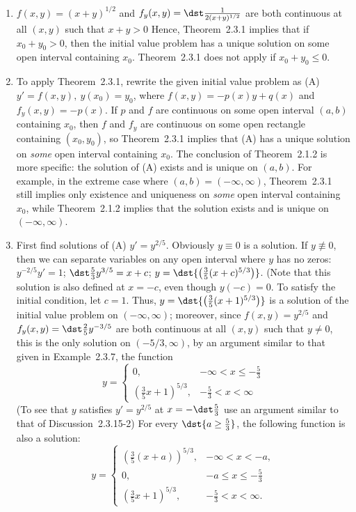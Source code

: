 \documentclass[openany]{book}
\newenvironment{sectionSolutions}{
 \begin{enumerate}[item-label={\thesection.\arabic{enumi}.}]
}{
 \end{enumerate}
}
\begin{document}
\begin{sectionSolutions}
\item
$f(x,y)=(x+y)^{1/2}$ and $f_y(x,y)=\dst\frac{1}{2(x+y)^{1/2}}$ are both
continuous at all $(x,y)$ such that $x+y>0$ Hence,
 Theorem~2.3.1 implies that if $x_0+y_0>0$, then the initial
value problem has a
 unique solution on some open interval containing  $x_0$.
 Theorem~2.3.1 does not apply if $x_0+y_0\le0$.

\item
To apply  Theorem~2.3.1, rewrite the given initial value problem
as (A) $y'=f(x,y),\ y(x_0)=y_0$, where $f(x,y)=-p(x)y+q(x)$ and
$f_y(x,y)=-p(x)$. If $p$ and $f$ are continuous on some open interval
$(a,b)$ containing $x_0$, then $f$ and $f_y$ are continuous on some
open
rectangle containing $(x_0,y_0)$, so  Theorem~2.3.1 implies
that (A) has a unique solution  on {\it some\/} open
interval
containing $x_0$. The conclusion of Theorem~2.1.2 is more
specific:
the solution of (A) exists and is unique on $(a,b)$. For example, in
the extreme case where $(a,b)=(-\infty,\infty)$,  Theorem~2.3.1
still implies only existence and uniqueness on {\it some\/} open
interval containing $x_0$, while  Theorem~2.1.2 implies that the
solution exists and is unique on $(-\infty,\infty)$.


\item
First find solutions of (A) $y'=y^{2/5}$. Obviously $y\equiv0$ is a
solution. If $y\not\equiv0$, then we can separate variables on any
open interval where $y$ has no zeros: $y^{-2/5}y'=1$;\;
$\dst\frac{5}{3}y^{3/5}=x+c$;\;
$y=\dst{\left(\frac{3}{5}(x+c)^{5/3}\right)}$. (Note that this solution
is also defined  at $x=-c$, even though  $y(-c)=0$. To satisfy the
initial condition, let $c=1$. Thus,
$y=\dst{\left(\frac{3}{5}(x+1)^{5/3}\right)}$ is a solution of the
initial value problem on $(-\infty,\infty)$; moreover,
since $f(x,y)=y^{2/5}$ and $f_y(x,y)=\dst\frac{2}{5}y^{-3/5}$
are both continuous  at all $(x,y)$ such that $y\ne0$,
this is the only
solution on $(-5/3,\infty)$, by an argument similar to that given in
Example~2.3.7, the function
\[
y =
\begin{cases}
0, &  -\infty< x \le -\frac{5}{ 3} \\
\left(\frac{3}{ 5}x + 1\right)^{5/3}, & -\frac{5}{3} < x < \infty
\end{cases}
\]
(To see that $y$ satisfies $y'=y^{2/5}$  at $x=-\dst\frac{5}{3}$
use an argument similar to that of
Discussion~2.3.15-2)
For every $\dst{a \ge \frac{5}{ 3}}$, the following function is also a
solution:
\[
y =
\begin{cases}
\left( \frac{3}{ 5} (x+a) \right)^{5/3}, & - \infty < x < -a, \\[3pt]
0, &  -a \le x \le -\frac{5}{ 3} \\[3pt]
\left(\frac{3}{ 5}x + 1\right)^{5/3}, & -\frac{5}{3} < x < \infty.
\end{cases}
\]



\end{sectionSolutions}
\end{document}

